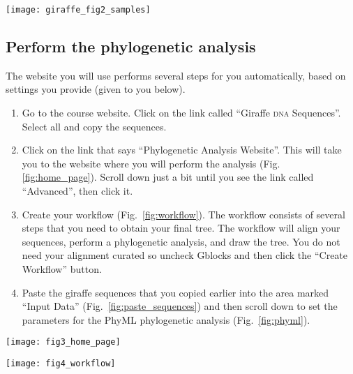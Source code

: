 \documentclass[11pt, addpoints]{exam}
\begin{document}
\begin{center}
	\texttt{[image: giraffe\_fig2\_samples]}
\end{center}

\subsection*{Perform the phylogenetic analysis}

The website you will use performs several steps for you automatically,
based on settings you provide (given to you below).

\begin{enumerate}
\item
  Go to the course website. Click on the link called ``Giraffe \textsc{dna}
  Sequences''. Select all and copy the sequences.
\item
  Click on the link that says ``Phylogenetic Analysis Website''. This
  will take you to the website where you will perform the analysis (Fig.
  \ref{fig:home_page}). Scroll down just a bit until you see the link called ``Advanced'',
  then click it.
\item Create your workflow (Fig.~\ref{fig:workflow}). The workflow consists of several steps
  that you need to obtain your final tree. The workflow will align your
  sequences,  perform a phylogenetic analysis, and draw the
  tree. You do not need your alignment curated so uncheck Gblocks and
  then click the “Create Workflow” button.
\item
  Paste the giraffe sequences that you copied earlier into the area
  marked “Input Data” (Fig.~\ref{fig:paste_sequences}) and then scroll down to set the
  parameters for the PhyML phylogenetic analysis (Fig.~\ref{fig:phyml}).
\end{enumerate}

\begin{center}
	\texttt{[image: fig3\_home\_page]}
\end{center}


\begin{center}
	\texttt{[image: fig4\_workflow]}
\end{center}
\end{document}
